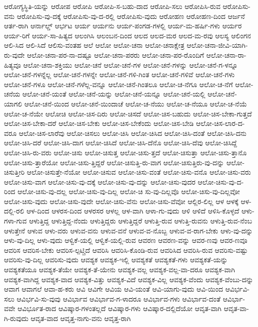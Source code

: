 {ಆರೋಗ್ಯಸ್ಥಿತಿ-ಯನ್ನು
ಆರೋಪ
ಆರೋಪಿ
ಆರೋಪಿ-ಸ-ಬಹು-ದಾದ
ಆರೋಪಿ-ಸಲು
ಆರೋಪಿಸಿ-ರುವ
ಆರೋಪಿಸು-ವನು
ಆರೋಪಿಸು-ವು-ದಕ್ಕೆ
ಆರೋಪಿಸು-ವು-ದ-ರಲ್ಲಿ
ಆರೋಪಿಸು-ವುದು
ಆರೋಹಣ
ಆರೋಹಣ-ದಿಂದ
ಆರ್ಜನೆ
ಆರ್ತ-ರಾಗಿ
ಆರ್ನಾಲ್ಡ್
ಆರ್ಭಟ
ಆರ್ಯ
ಆರ್ಯನು
ಆರ್ಯ-ಪಂಗಡ-ಗಳಲ್ಲಿ
ಆರ್ಯ-ಮ-ಹರ್ಷಿ-ಗಳು
ಆರ್ಯರ
ಆರ್ಯ-ರಿಗೆ
ಆರ್ಯ-ಸಾ-ಹಿತ್ಯದ
ಆಲಂಗಿಸಿ
ಆಲಂಬನ-ದಿಂದ
ಆಲದ
ಆಲದ-ಮರ
ಆಲದ-ಮ-ರವು
ಆಲಸ್ಯ
ಆಲಿಂಗನ
ಆಲಿ-ಸಿದ
ಆಲಿ-ಸಿದೆ
ಆಲಿಸು-ವಂತಹ
ಆಲೆ
ಆಲೋ
ಆಲೋ-ಚನಾ
ಆಲೋ-ಚನಾಕ್ಷೇತ್ರ
ಆಲೋ-ಚನಾ-ಜೀವಿ-ಯಾಗಿ-ರು-ವುದೇ
ಆಲೋ-ಚನಾ-ಪರ-ನಾ-ದಷ್ಟೂ
ಆಲೋ-ಚನಾ-ಪರರು
ಆಲೋ-ಚನಾ-ಪರ-ರೊಂದಿಗೆ
ಆಲೋ-ಚನಾ-ರಾ-ಹಿತ್ಯವೂ
ಆಲೋ-ಚನಾ-ಶಕ್ತಿಯು
ಆಲೋ-ಚನೆ
ಆಲೋ-ಚನೆ-ಗಳ
ಆಲೋ-ಚನೆ-ಗಳನ್ನು
ಆಲೋ-ಚನೆ-ಗ-ಳನ್ನೂ
ಆಲೋ-ಚನೆ-ಗಳನ್ನೆಲ್ಲ
ಆಲೋ-ಚನೆ-ಗಳನ್ನೇ
ಆಲೋ-ಚನೆ-ಗಳಿ-ಗಿಂತ
ಆಲೋ-ಚನೆ-ಗಳಿವೆ
ಆಲೋ-ಚನೆ-ಗಳು
ಆಲೋ-ಚನೆ-ಗಳೂ
ಆಲೋ-ಚನೆ-ಗಳೆಲ್ಲ-ವನ್ನೂ
ಆಲೋ-ಚನೆ-ಗಿಂತಲೂ
ಆಲೋ-ಚ-ನೆಗೂ
ಆಲೋ-ಚ-ನೆಗೆ
ಆಲೋ-ಚನೆಯ
ಆಲೋ-ಚನೆ-ಯಂತೆ
ಆಲೋ-ಚನೆ-ಯನ್ನು
ಆಲೋ-ಚನೆ-ಯನ್ನೂ
ಆಲೋ-ಚನೆ-ಯಲ್ಲಿ
ಆಲೋ-ಚನೆ-ಯಾಗಲಿ
ಆಲೋ-ಚನೆ-ಯಿಂದ
ಆಲೋ-ಚನೆ-ಯಿಂದಾಚೆ
ಆಲೋ-ಚ-ನೆಯು
ಆಲೋ-ಚ-ನೆಯೂ
ಆಲೋ-ಚ-ನೆಯೆ
ಆಲೋ-ಚ-ನೆಯೇ
ಆಲೋಚಿ
ಆಲೋ-ಚಿಸ-ದಿರು
ಆಲೋ-ಚಿಸದೆ
ಆಲೋ-ಚಿಸ-ಬಹುದು
ಆಲೋ-ಚಿಸ-ಬೇಕಾ-ಗುತ್ತದೆ
ಆಲೋ-ಚಿಸ-ಬೇಕಾ-ದರೆ
ಆಲೋ-ಚಿಸ-ಬೇಕು
ಆಲೋ-ಚಿಸ-ಬೇಕೆಂದು
ಆಲೋ-ಚಿಸ-ಬೇಡಿ
ಆಲೋ-ಚಿಸ-ಲಾರ-ದ-ವರೂ
ಆಲೋ-ಚಿಸ-ಲಾರೆವು
ಆಲೋ-ಚಿಸಲು
ಆಲೋ-ಚಿಸಿ
ಆಲೋ-ಚಿಸಿದ
ಆಲೋ-ಚಿಸಿ-ದಂತೆ
ಆಲೋ-ಚಿಸಿ-ದನು
ಆಲೋ-ಚಿಸಿ-ದರೆ
ಆಲೋ-ಚಿಸಿ-ದಾಗ
ಆಲೋ-ಚಿಸಿದೆ
ಆಲೋ-ಚಿಸಿ-ದೆನೊ
ಆಲೋ-ಚಿಸಿ-ದೆವು
ಆಲೋ-ಚಿಸಿದ್ದೆ
ಆಲೋ-ಚಿಸಿ-ರು-ವರು
ಆಲೋ-ಚಿಸು
ಆಲೋ-ಚಿಸುತ್ತ
ಆಲೋ-ಚಿಸು-ತ್ತದೆ
ಆಲೋ-ಚಿಸುತ್ತಾ
ಆಲೋ-ಚಿಸು-ತ್ತಾನೊ
ಆಲೋ-ಚಿಸು-ತ್ತಾರೆಯೋ
ಆಲೋ-ಚಿಸು-ತ್ತಿದ್ದರೆ
ಆಲೋ-ಚಿಸುತ್ತಿ-ರು-ವಾಗ
ಆಲೋ-ಚಿಸುತ್ತಿರು-ವು-ದನ್ನು
ಆಲೋ-ಚಿಸುತ್ತೀರಿ
ಆಲೋ-ಚಿಸುತ್ತೇ-ನೆಯೋ
ಆಲೋ-ಚಿಸುವ
ಆಲೋ-ಚಿಸು-ವಂತೆ
ಆಲೋ-ಚಿಸು-ವನೊ
ಆಲೋ-ಚಿಸು-ವರು
ಆಲೋ-ಚಿಸು-ವಾಗ
ಆಲೋ-ಚಿಸು-ವು-ದಕ್ಕೆ
ಆಲೋ-ಚಿಸು-ವು-ದನ್ನು
ಆಲೋ-ಚಿಸು-ವುದರ
ಆಲೋ-ಚಿಸು-ವು-ದ-ರಿಂದ
ಆಲೋ-ಚಿಸು-ವು-ದಲ್ಲ
ಆಲೋ-ಚಿಸು-ವು-ದಿಲ್ಲ
ಆಲೋ-ಚಿ ಸು-ವು-ದಿಲ್ಲವೊ
ಆಲೋ-ಚಿಸು-ವು-ದಿಲ್ಲವೋ
ಆಲೋ-ಚಿಸು-ವುದು
ಆಲೋ-ಚಿಸು-ವುದೇ
ಆಲೋ-ಚಿಸು-ವೆನು
ಆಲೋ-ಚಿಸು-ವೆವೋ
ಆಲ್ಲಿರ-ಲಿಲ್ಲ
ಆಳ
ಆಳಕ್ಕೆ
ಆಳ-ದಲ್ಲಿ-ರಲಿ
ಆಳ-ದಿಂದ
ಆಳರಸ-ದಿಂದ
ಆಳರಸರ
ಆಳಲ್ಲ
ಆಳ-ವಾಗಿ
ಆಳಾ-ಗು-ವುದು
ಆಳಿ
ಆಳಿದೆ
ಆಳಿಸಿ-ಕೊಳ್ಳದೆ
ಆಳು-ಗಳಾ-ಗುವ
ಆಳುತ್ತಿದ್ದ
ಆಳುತ್ತಿದ್ದ-ನೆಂದು
ಆಳುತ್ತಿದ್ದರು
ಆಳುತ್ತಿದ್ದರೆ
ಆಳುತ್ತಿ-ರುವ
ಆಳುತ್ತಿ-ರುವನು
ಆಳುತ್ತಿ-ರುವ-ನೆಂಬ
ಆಳುತ್ತೇನೆ
ಆಳುವ
ಆಳು-ವರು
ಆಳುವ-ವನು
ಆಳುವ-ವನೆ
ಆಳುವ-ವ-ನೊಬ್ಬ
ಆಳುವ-ವ-ರಾಗ-ಬೇಕು
ಆಳು-ವು-ದನ್ನು
ಆಳು-ವು-ದಿಲ್ಲ
ಆಳು-ವುದು
ಆಳ್ವಿಕೆ-ಯಲ್ಲಿ
ಆಳ್ವಿಕೆ-ಯಲ್ಲಿ-ರುವ
ಆವರಣ
ಆವರಣ-ವನ್ನು
ಆವರ-ಣವು
ಆವರ-ಣವೂ
ಆವರಿಸ
ಆವರಿಸ-ಬೇಕು
ಆವರಿಸ-ಲ್ಪಟ್ಚಿದೆ
ಆವರಿಸಿ
ಆವರಿಸಿ-ಕೊಂಡಿ-ರುವ
ಆವರಿಸಿದ
ಆವರಿಸಿ-ರುವ
ಆವರಿಸು-ವಷ್ಟು
ಆವರಿಸು-ವು-ದಿಲ್ಲ
ಆವರಿಸು-ವುದು
ಆವಶ್ಯಕ
ಆವಶ್ಯಕ-ಇಲ್ಲಿ
ಆವಶ್ಯಕತೆ
ಆವಶ್ಯಕತೆ-ಗಳು
ಆವಶ್ಯಕತೆ-ಯನ್ನು
ಆವಶ್ಯಕತೆಯೂ
ಆವಶ್ಯಕ-ತೆಯೇ
ಆವಶ್ಯಕ-ತೆ-ಯೇನು
ಆವಶ್ಯಕ-ವಲ್ಲ
ಆವಶ್ಯಕ-ವಲ್ಲ-ವಾ-ದರೂ
ಆವಶ್ಯಕ-ವಾಗಿ
ಆವಶ್ಯಕ-ವಾಗಿದ್ದ
ಆವಶ್ಯಕ-ವಾದ
ಆವಶ್ಯಕ-ವಿತ್ತು
ಆವಶ್ಯಕ-ವಿದೆ
ಆವಶ್ಯಕ-ವಿಲ್ಲ
ಆವಶ್ಯಕ-ವೆಂದು
ಆವಶ್ಯಕ-ವೆಂಬು-ದನ್ನು
ಆವಾಗ
ಆವಾಗಲೆ
ಆವಾ-ಹ-ಕರು
ಆವಿ
ಆವಿಗೇ
ಆವಿಯ
ಆವಿ-ಯಂತೆ
ಆವಿ-ಯಾಗು-ವುದು
ಆವಿ-ಯಿಂದ
ಆವಿರ್ಭವಿ-ಸಲು
ಆವಿರ್ಭವಿ-ಸು-ವುವು
ಆವಿರ್ಭಾವ
ಆವಿರ್ಭಾವ-ಗ-ಳಾದರೂ
ಆವಿರ್ಭಾವ-ಗಳು
ಆವಿರ್ಭಾವ-ದಂತೆ
ಆವಿರ್ಭಾ-ವವೇ
ಆವಿರ್ಭೂತ-ರಾದ
ಆವಿಷ್ಕಾರ-ಗಳಂತಲ್ಲದೆ
ಆವಿಷ್ಕಾರ-ಗಳು
ಆವಿಷ್ಕಾರ-ದಲ್ಲಿದೆಯೋ
ಆವೃತ-ವಾಗಿ
ಆವೃತ-ವಾ-ಗಿ-ರುವುದು
ಆವೃತ-ವಾದ
ಆವೃತ್ತ-ನಾಗು-ವನು
ಆವೃತ್ತ-ರಾಗಿ
}
